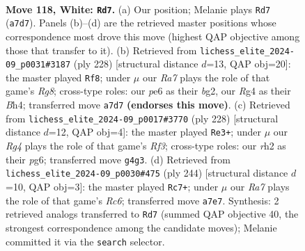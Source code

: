 \documentclass[11pt]{article}
\begin{document}
\clearpage

\begin{figure}[p]\centering
\begin{subfigure}{0.46\textwidth}\centering
\resizebox{\linewidth}{!}{%
\newchessgame
\chessboard[
  setfen={1k6/R7/4p3/4P3/5PR1/8/7r/5K2 w - - 21 118},
  showmover=false,
  pgfstyle=straightmove, color=movearrow, markmove={a7-d7}
]}
\caption{}
\end{subfigure}\hfill
\begin{subfigure}{0.46\textwidth}\centering
\resizebox{\linewidth}{!}{%
\newchessgame
\chessboard[
  setfen={6R1/7k/4r3/K1P4p/7B/6P1/6b1/8 w - - 45 115},
  showmover=false,
  pgfstyle=straightmove, color=movearrow, markmove={g8-f8}
]}
\caption{}
\end{subfigure}
\\[4pt]
\begin{subfigure}{0.46\textwidth}\centering
\resizebox{\linewidth}{!}{%
\newchessgame
\chessboard[
  setfen={8/r7/4k1p1/7p/7P/5RP1/8/6K1 w - - 66 115},
  showmover=false,
  pgfstyle=straightmove, color=movearrow, markmove={f3-e3}
]}
\caption{}
\end{subfigure}\hfill
\begin{subfigure}{0.46\textwidth}\centering
\resizebox{\linewidth}{!}{%
\newchessgame
\chessboard[
  setfen={8/6k1/2R5/7p/7P/6P1/6K1/1r6 w - - 91 123},
  showmover=false,
  pgfstyle=straightmove, color=movearrow, markmove={c6-c7}
]}
\caption{}
\end{subfigure}
\caption{\textbf{Move 118, White: \texttt{Rd7}.} (a) Our position; Melanie plays \texttt{Rd7} (\texttt{a7d7}). Panels (b)--(d) are the retrieved master positions whose correspondence most drove this move (highest QAP objective among those that transfer to it). (b) Retrieved from \texttt{lichess\_elite\_2024-09\_p0031\#3187} (ply 228) [structural distance $d$=13, QAP obj=20]: the master played \texttt{Rf8}; under $\mu$ our \emph{Ra7} plays the role of that game's \emph{Rg8}; cross-type roles: our \emph{p}e6 as their \emph{b}g2, our \emph{R}g4 as their \emph{B}h4; transferred move \texttt{a7d7} \textbf{(endorses this move)}. (c) Retrieved from \texttt{lichess\_elite\_2024-09\_p0017\#3770} (ply 228) [structural distance $d$=12, QAP obj=4]: the master played \texttt{Re3+}; under $\mu$ our \emph{Rg4} plays the role of that game's \emph{Rf3}; cross-type roles: our \emph{r}h2 as their \emph{p}g6; transferred move \texttt{g4g3}. (d) Retrieved from \texttt{lichess\_elite\_2024-09\_p0030\#475} (ply 244) [structural distance $d$=10, QAP obj=3]: the master played \texttt{Rc7+}; under $\mu$ our \emph{Ra7} plays the role of that game's \emph{Rc6}; transferred move \texttt{a7e7}. Synthesis: 2 retrieved analogs transferred to \texttt{Rd7} (summed QAP objective 40, the strongest correspondence among the candidate moves); Melanie committed it via the \texttt{search} selector.}
\label{fig:thought-m234}
\end{figure}
\end{document}
